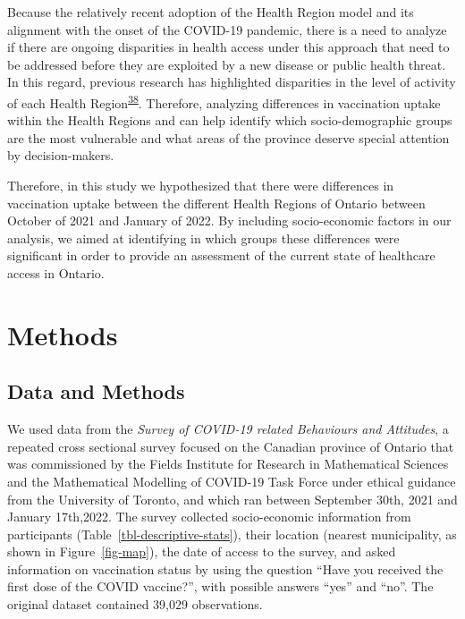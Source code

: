 \documentclass[
  letterpaper,
  DIV=11,
  numbers=noendperiod]{scrartcl}
\begin{document}
Because the relatively recent adoption of the Health Region model and
its alignment with the onset of the COVID-19 pandemic, there is a need
to analyze if there are ongoing disparities in health access under this
approach that need to be addressed before they are exploited by a new
disease or public health threat. In this regard, previous research has
highlighted disparities in the level of activity of each Health
Region\textsuperscript{\protect\hyperlink{ref-sethuram2023}{38}}.
Therefore, analyzing differences in vaccination uptake within the Health
Regions and can help identify which socio-demographic groups are the
most vulnerable and what areas of the province deserve special attention
by decision-makers.

Therefore, in this study we hypothesized that there were differences in
vaccination uptake between the different Health Regions of Ontario
between October of 2021 and January of 2022. By including socio-economic
factors in our analysis, we aimed at identifying in which groups these
differences were significant in order to provide an assessment of the
current state of healthcare access in Ontario.

\hypertarget{methods}{%
\section{Methods}\label{methods}}

\hypertarget{sec-data}{%
\subsection{Data and Methods}\label{sec-data}}

We used data from the \emph{Survey of COVID-19 related Behaviours and
Attitudes}, a repeated cross sectional survey focused on the Canadian
province of Ontario that was commissioned by the Fields Institute for
Research in Mathematical Sciences and the Mathematical Modelling of
COVID-19 Task Force under ethical guidance from the University of
Toronto, and which ran between September 30th, 2021 and January
17th,2022. The survey collected socio-economic information from
participants (Table~\ref{tbl-descriptive-stats}), their location
(nearest municipality, as shown in Figure~\ref{fig-map}), the date of
access to the survey, and asked information on vaccination status by
using the question ``Have you received the first dose of the COVID
vaccine?'', with possible answers ``yes'' and ``no''. The original
dataset contained 39,029 observations.
\end{document}
